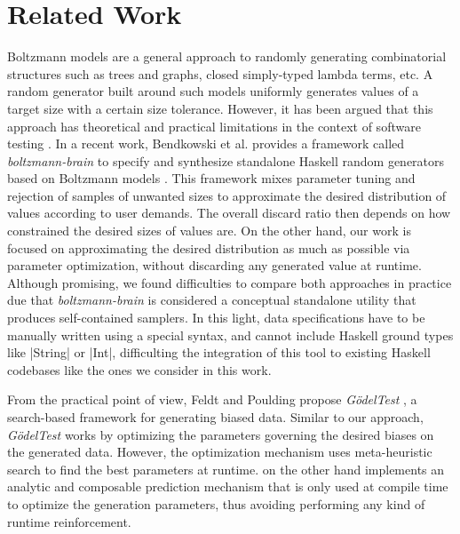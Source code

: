 \section{Related Work}


%
%
Boltzmann models \cite{Duchon2004} are a general approach to randomly generating
combinatorial structures such as trees and graphs, closed simply-typed lambda
terms, etc.
%
A random generator built around such models uniformly generates values of a
target size with a certain size tolerance.
%
However, it has been argued that this approach has theoretical and practical
limitations in the context of software testing \cite{feldt2013}.
%
In a recent work, Bendkowski et al. provides a framework called
\emph{boltzmann-brain} to specify and synthesize standalone Haskell random
generators based on Boltzmann models \cite{bendkowski2018}.
%
This framework mixes parameter tuning and rejection of samples of unwanted sizes
to approximate the desired distribution of values according to user demands.
%
The overall discard ratio then depends on how constrained the desired sizes of
values are.
%
On the other hand, our work is focused on approximating the desired distribution
as much as possible via parameter optimization, without discarding any generated
value at runtime.
%
Although promising, we found difficulties to compare both approaches in practice
due that \emph{boltzmann-brain} is considered a conceptual standalone utility
that produces self-contained samplers.
%
In this light, data specifications have to be manually written using a special
syntax, and cannot include Haskell ground types like |String| or |Int|,
difficulting the integration of this tool to existing Haskell codebases like the
ones we consider in this work.



%
%
From the practical point of view, Feldt and Poulding propose \emph{G\"odelTest}
\cite{feldt2013}, a search-based framework for generating biased data.
%
%
Similar to our approach, \emph{G\"odelTest} works by optimizing the parameters
governing the desired biases on the generated data.
%
However, the optimization mechanism uses meta-heuristic search to find the best
parameters at runtime.
%
\dragenp on the other hand implements an analytic and composable prediction
mechanism that is only used at compile time to optimize the generation
parameters, thus avoiding performing any kind of runtime reinforcement.


